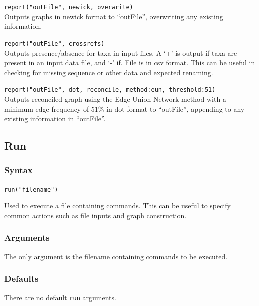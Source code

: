 	\begin{example}
		\item{\texttt{report("outFile", newick, overwrite)}\\ Outputs graphs in newick format to 
		``outFile'', overwriting any existing information.}
		
		\item{\texttt{report("outFile", crossrefs)}\\ Outputs presence/absence for taxa in input files. 
		A `+' is output if taxa are present in an input data file, and `-' if. File is in csv format. This 
		can be useful in checking for missing sequence or other data and expected renaming.}
		
		\item{\texttt{report("outFile", dot, reconcile, method:eun, threshold:51)}\\ Outputs reconciled 
		graph using the Edge-Union-Network method with a minimum edge frequency of 51\% in 
		dot format to ``outFile'', appending to any existing information in ``outFile''.}
	\end{example}

\subsection{Run}
	\subsubsection{Syntax}
		\texttt{run("filename")}
		
	\begin{phygdescription}
		{Used to execute a file containing commands. This can be useful to specify common actions 
		such as file inputs and graph construction. }
	\end{phygdescription}
	
	\subsubsection{Arguments}
		The only argument is the filename containing commands to be executed.
		
	\subsubsection{Defaults}
		There are no default \texttt{run} arguments. 
	
